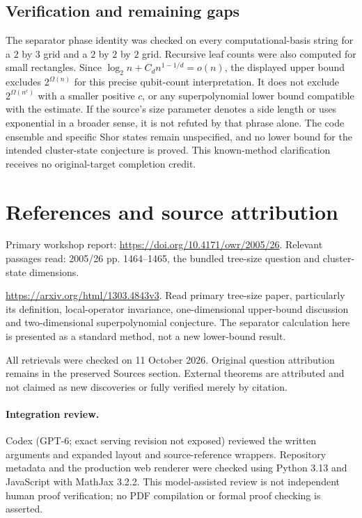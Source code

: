 \documentclass[11pt]{article}
\begin{document}
\subsection{Verification and remaining gaps}
The separator phase identity was checked on every computational-basis string for a $2$ by $3$ grid and a $2$ by $2$ by $2$ grid. Recursive leaf counts were also computed for small rectangles. Since $\log_2n+C_dn^{1-1/d}=o(n)$, the displayed upper bound excludes $2^{\Omega(n)}$ for this precise qubit-count interpretation. It does not exclude $2^{\Omega(n^c)}$ with a smaller positive $c$, or any superpolynomial lower bound compatible with the estimate. If the source's size parameter denotes a side length or uses exponential in a broader sense, it is not refuted by that phrase alone. The code ensemble and specific Shor states remain unspecified, and no lower bound for the intended cluster-state conjecture is proved. This known-method clarification receives no original-target completion credit.

\section{References and source attribution}
Primary workshop report: \url{https://doi.org/10.4171/owr/2005/26}. Relevant passages read: 2005/26 pp. 1464--1465, the bundled tree-size question and cluster-state dimensions.

\url{https://arxiv.org/html/1303.4843v3}. Read primary tree-size paper, particularly its definition, local-operator invariance, one-dimensional upper-bound discussion and two-dimensional superpolynomial conjecture. The separator calculation here is presented as a standard method, not a new lower-bound result.

All retrievals were checked on 11 October 2026. Original question attribution remains in the preserved Sources section. External theorems are attributed and not claimed as new discoveries or fully verified merely by citation.


\paragraph{Integration review.} Codex (GPT-6; exact serving revision not exposed) reviewed the written arguments and expanded layout and source-reference wrappers. Repository metadata and the production web renderer were checked using Python 3.13 and JavaScript with MathJax 3.2.2. This model-assisted review is not independent human proof verification; no PDF compilation or formal proof checking is asserted.
\end{document}

